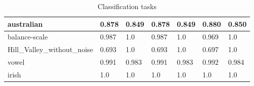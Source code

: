 \begin{table}[]
\begin{tabular}{|l|l|l|l|l|l|l|}
australian                   & 0.878                                        & 0.849                                        & 0.878                                           & 0.849                                           & 0.880                                             & 0.850                                             \\ \hline
balance-scale                & 0.987                                        & 1.0                                          & 0.987                                           & 1.0                                             & 0.969                                             & 1.0                                               \\ \hline
Hill\_Valley\_without\_noise & 0.693                                        & 1.0                                          & 0.693                                           & 1.0                                             & 0.697                                             & 1.0                                               \\ \hline
vowel                        & 0.991                                        & 0.983                                        & 0.991                                           & 0.983                                           & 0.992                                             & 0.984                                             \\ \hline
irish                        & 1.0                                          & 1.0                                          & 1.0                                             & 1.0                                             & 1.0                                               & 1.0                                               \\ \hline
\end{tabular}
\caption{Classification tasks}
\label{tbl:classification_tasks}
\end{table}


